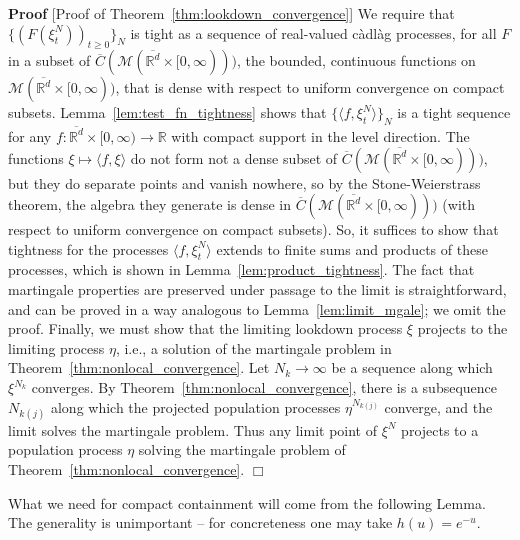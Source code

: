 \documentclass[12pt]{article}
\newenvironment {proof}{{\noindent\bf Proof }}{\hfill $\Box$ \medskip}
\def \bar{\overline}
\newcommand{\IR}{\mathbb R}
\newcommand{\lp}{\xi}              %
\newcommand{\lpmeasures}{\mathcal{M}(\overline{\IR^d} \times [0,\infty))} %
\numberwithin{equation}{section}
\begin{document}
\begin{proof}[Proof of Theorem~\ref{thm:lookdown_convergence}]
    We require that $\{(F(\lp^N_t))_{t \ge 0}\}_N$
    is tight as a sequence of real-valued c\`adl\`ag processes, for all $F$ in a subset
    of $\bar C(\lpmeasures)$, the bounded, continuous functions on $\lpmeasures$,
    that is dense with respect to uniform convergence on compact subsets.
    Lemma~\ref{lem:test_fn_tightness} shows that $\{\langle f, \lp^N_t \rangle\}_N$ is a tight sequence
    for any $f: \overline{\IR^d} \times [0,\infty) \to \IR$ with compact support
    in the level direction.
    The functions $\lp \mapsto \langle f, \lp \rangle$
    do not form not a dense subset of $\bar C(\lpmeasures)$,
    but they do separate points and vanish nowhere, so
    by the Stone-Weierstrass theorem, the algebra they generate is dense
    in $\bar C(\lpmeasures)$ (with respect to uniform convergence on compact subsets).
    So, it suffices to show that tightness for the processes $\langle f, \lp^N_t\rangle$
    extends to finite sums and products of these processes,
    which is shown in Lemma~\ref{lem:product_tightness}.
    The fact that martingale properties are preserved under passage to the limit
    is straightforward, and can be proved in a way analogous to Lemma~\ref{lem:limit_mgale};
    we omit the proof.
    Finally, we must show that the limiting lookdown process $\lp$
    projects to the limiting process $\eta$, i.e., a solution of the martingale
    problem in Theorem~\ref{thm:nonlocal_convergence}.
    Let $N_k \to \infty$ be a sequence along which $\lp^{N_k}$ converges.
    By Theorem~\ref{thm:nonlocal_convergence},
    there is a subsequence $N_{k(j)}$ along which the projected population processes
    $\eta^{N_{k(j)}}$ converge, and the limit solves the martingale problem.
    Thus any limit point of $\lp^N$ projects to a population process $\eta$
    solving the martingale problem of Theorem~\ref{thm:nonlocal_convergence}.
\end{proof}

What we need for compact containment will come from the following Lemma.
The generality is unimportant --
for concreteness one may take $h(u) = e^{-u}$.
\end{document}

